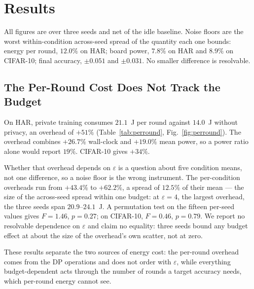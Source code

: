 \section{Results}
\label{sec:Results}

All figures are over three seeds and net of the idle baseline. Noise floors
are the worst within-condition across-seed spread of the quantity each one
bounds: energy per round, $12.0\%$ on HAR; board power, $7.8\%$ on HAR and
$8.9\%$ on CIFAR-10; final accuracy, $\pm 0.051$ and $\pm 0.031$. No smaller
difference is resolvable.

\subsection{The Per-Round Cost Does Not Track the Budget}

On HAR, private training consumes $21.1$~J per round against $14.0$~J without privacy, an overhead of $+51\%$ 
(Table~\ref{tab:perround}, Fig.~\ref{fig:perround}). The overhead combines $+26.7\%$ wall-clock and
$+19.0\%$ mean power, so a power ratio alone would report $19\%$. CIFAR-10
gives $+34\%$.

Whether that overhead depends on $\varepsilon$ is a question about five
condition means, not one difference, so a noise floor is the wrong instrument.
The per-condition overheads run from $+43.4\%$ to $+62.2\%$, a spread of
$12.5\%$ of their mean --- the size of the across-seed spread within one
budget: at $\varepsilon = 4$, the largest overhead, the three seeds span
$20.9$--$24.1$~J. A permutation test on
the fifteen per-seed values gives $F = 1.46$, $p = 0.27$; on CIFAR-10,
$F = 0.46$, $p = 0.79$. We report no resolvable dependence on $\varepsilon$
and claim no equality: three seeds bound any budget effect at about the size
of the overhead's own scatter, not at zero.

These results separate the two sources of energy cost: the per-round overhead comes from the DP operations and does not order with $\varepsilon$, while everything budget-dependent acts through the number of rounds a target accuracy needs, which per-round energy cannot see.

